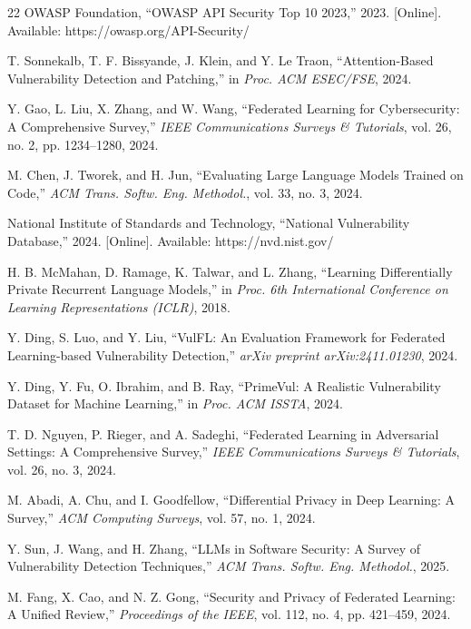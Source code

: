 \documentclass[conference]{IEEEtran}
\begin{document}
\begin{thebibliography}{22}
OWASP Foundation, ``OWASP API Security Top 10 2023,'' 2023. [Online]. Available: https://owasp.org/API-Security/

T. Sonnekalb, T. F. Bissyande, J. Klein, and Y. Le Traon, ``Attention-Based Vulnerability Detection and Patching,'' in \textit{Proc. ACM ESEC/FSE}, 2024.

Y. Gao, L. Liu, X. Zhang, and W. Wang, ``Federated Learning for Cybersecurity: A Comprehensive Survey,'' \textit{IEEE Communications Surveys \& Tutorials}, vol. 26, no. 2, pp. 1234--1280, 2024.

M. Chen, J. Tworek, and H. Jun, ``Evaluating Large Language Models Trained on Code,'' \textit{ACM Trans. Softw. Eng. Methodol.}, vol. 33, no. 3, 2024.

National Institute of Standards and Technology, ``National Vulnerability Database,'' 2024. [Online]. Available: https://nvd.nist.gov/

H. B. McMahan, D. Ramage, K. Talwar, and L. Zhang, ``Learning Differentially Private Recurrent Language Models,'' in \textit{Proc. 6th International Conference on Learning Representations (ICLR)}, 2018.

Y. Ding, S. Luo, and Y. Liu, ``VulFL: An Evaluation Framework for Federated Learning-based Vulnerability Detection,'' \textit{arXiv preprint arXiv:2411.01230}, 2024.

Y. Ding, Y. Fu, O. Ibrahim, and B. Ray, ``PrimeVul: A Realistic Vulnerability Dataset for Machine Learning,'' in \textit{Proc. ACM ISSTA}, 2024.

T. D. Nguyen, P. Rieger, and A. Sadeghi, ``Federated Learning in Adversarial Settings: A Comprehensive Survey,'' \textit{IEEE Communications Surveys \& Tutorials}, vol. 26, no. 3, 2024.

M. Abadi, A. Chu, and I. Goodfellow, ``Differential Privacy in Deep Learning: A Survey,'' \textit{ACM Computing Surveys}, vol. 57, no. 1, 2024.

Y. Sun, J. Wang, and H. Zhang, ``LLMs in Software Security: A Survey of Vulnerability Detection Techniques,'' \textit{ACM Trans. Softw. Eng. Methodol.}, 2025.

M. Fang, X. Cao, and N. Z. Gong, ``Security and Privacy of Federated Learning: A Unified Review,'' \textit{Proceedings of the IEEE}, vol. 112, no. 4, pp. 421--459, 2024.

\end{thebibliography}
\end{document}
